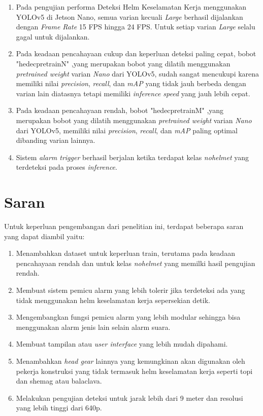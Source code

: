 \begin{enumerate}[nolistsep]
    \item Pada pengujian performa Deteksi Helm Keselamatan Kerja menggunakan YOLOv5 di Jetson Nano, semua varian kecuali \emph{Large} berhasil dijalankan dengan \emph{Frame Rate} 15 FPS hingga 24 FPS. Untuk setiap varian \emph{Large} selalu gagal untuk dijalankan.
    \item Pada keadaan pencahayaan cukup dan keperluan deteksi paling cepat, bobot "hedec\textunderscore pretrain\textunderscore N" ,yang merupakan bobot yang dilatih menggunakan \emph{pretrained weight} varian \emph{Nano} dari YOLOv5, sudah sangat mencukupi karena memiliki nilai \emph{precision}, \emph{recall}, dan \emph{mAP} yang tidak jauh berbeda dengan varian lain diatasnya tetapi memiliki \emph{inference speed} yang jauh lebih cepat.
    \item Pada keadaan pencahayaan rendah, bobot "hedec\textunderscore pretrain\textunderscore M" ,yang merupakan bobot yang dilatih menggunakan \emph{pretrained weight} varian \emph{Nano} dari YOLOv5, memiliki nilai \emph{precision}, \emph{recall}, dan \emph{mAP} paling optimal dibanding varian lainnya.
    \item Sistem \emph{alarm trigger} berhasil berjalan ketika terdapat kelas \emph{no\textunderscore helmet} yang terdeteksi pada proses \emph{inference}.
    
\end{enumerate}

\section{Saran}
\label{chap:saran}

\par Untuk keperluan pengembangan dari penelitian ini, terdapat beberapa saran yang dapat diambil yaitu:

\begin{enumerate}[nolistsep]

  \item Menambahkan dataset untuk keperluan train, terutama pada keadaan pencahayaan rendah dan untuk kelas \emph{no\textunderscore helmet} yang memilki hasil pengujian rendah.

  \item Membuat sistem pemicu alarm yang lebih tolerir jika terdeteksi ada yang tidak menggunakan helm keselamatan kerja sepersekian detik.
  
  \item Mengembangkan fungsi pemicu alarm yang lebih modular sehingga bisa menggunakan alarm jenis lain selain alarm suara.

  \item Membuat tampilan atau \emph{user interface} yang lebih mudah dipahami.

  \item Menambahkan \emph{head gear} lainnya yang kemungkinan akan digunakan oleh pekerja konstruksi yang tidak termasuk helm keselamatan kerja seperti topi dan shemag atau balaclava.
  \item Melakukan pengujian deteksi untuk jarak lebih dari 9 meter dan resolusi yang lebih tinggi dari 640p.

\end{enumerate}
